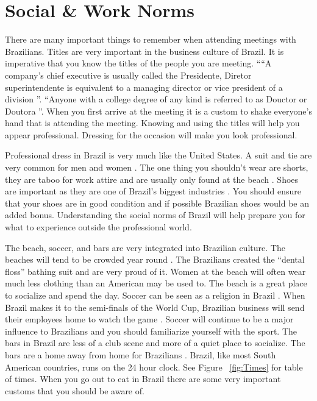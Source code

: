 \documentclass[11pt,a4paper,twoside]{report}
\begin{document}
\section{Social \& Work Norms}

There are many important things to remember when attending meetings with
Brazilians. Titles are very important in the business culture of Brazil. It
is imperative that you know the titles of the people you are meeting. ““A
company’s chief executive is usually called the Presidente, Diretor
superintendente is equivalent to a managing director or vice president of a
division \citep*[pg. 75]{herrington}”.  “Anyone with a college degree of any kind
is referred to as Douctor or Doutora \citep*[pg. 75]{herrington}”. When you first
arrive at the meeting it is a custom to shake everyone’s hand that is
attending the meeting. Knowing and using the titles will help you appear
professional. Dressing for the occasion will make you look professional.

Professional dress in Brazil is very much like the United States. A suit and
tie are very common for men and women \citep*[pg. 81]{herrington}. The one thing you
shouldn’t wear are shorts, they are taboo for work attire and are usually only
found at the beach \citep*[pg. 81]{herrington}. Shoes are important as they are one of
Brazil’s biggest industries \citep*{brazilCIA}.
You should ensure that your shoes are in good condition and if possible
Brazilian shoes would be an added bonus. Understanding the social norms of
Brazil will help prepare you for what to experience outside the professional
world.

The beach, soccer, and bars are very integrated into Brazilian culture. The
beaches will tend to be crowded year round \citep*[pg. 86]{herrington}. The Brazilians
created the “dental floss” bathing suit and are very proud of it. Women at the
beach will often wear much less clothing than an American may be used to. The
beach is a great place to socialize and spend the day.  Soccer can be seen as a
religion in Brazil \citep*[pg. 87]{herrington}. When Brazil makes it to the semi-finals
of the World Cup, Brazilian business will send their employees home to watch
the game \citep*[pg. 87]{herrington}. Soccer will continue to be a major influence to
Brazilians and you should familiarize yourself with the sport. The bars in
Brazil are less of a club scene and more of a quiet place to socialize. The
bars are a home away from home for Brazilians \citep*[pg. 87]{herrington}. Brazil, like
most South American countries, runs on the 24 hour clock. See Figure ~\ref{fig:Times} for
table of times.  When you go out to eat in Brazil there are some very important
customs that you should be aware of.
\end{document}
